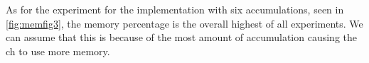 \documentclass[USenglish]{uit-thesis}
\begin{document}
As for the experiment for the implementation with six accumulations, seen in \autoref{fig:memfig3}, the memory percentage is the overall highest of all experiments. We can assume that this is because of the most amount of accumulation causing the \gls{ch} to use more memory.
 




\end{document}
